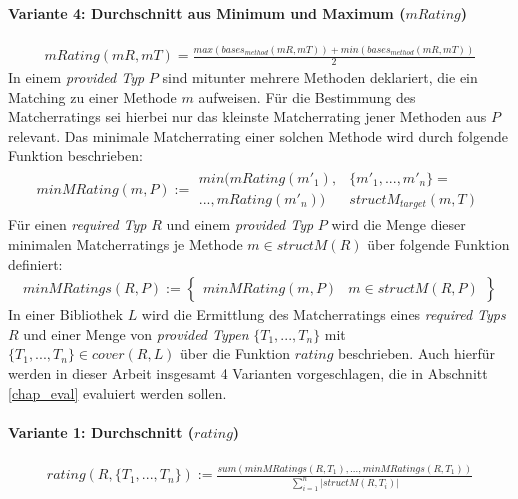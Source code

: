 \paragraph{Variante 4: Durchschnitt aus Minimum und Maximum ($\mathit{mRating}$)}

\begin{gather*}
\mathit{mRating(mR,mT)} = \frac{\mathit{max(bases_{method}(mR,mT))}+\mathit{min(bases_{method}(mR,mT))}}{2}
\end{gather*}
\noindent
In einem \emph{provided Typ} $P$ sind mitunter mehrere Methoden deklariert, die ein Matching zu einer Methode $m$ aufweisen. Für die Bestimmung des Matcherratings sei hierbei nur das kleinste Matcherrating jener Methoden aus $P$ relevant. Das minimale Matcherrating einer solchen Methode wird durch folgende Funktion beschrieben:
\begin{gather*}
\mathit{minMRating(m, P)} := 
	\begin{array}{l|l}
\mathit{min(mRating(m'_1),}
&
\{\mathit{m'_1,...,m'_n}\} =
\\
\mathit{...,mRating(m'_n))}
&
\mathit{structM_{target}(m, T)}
\end{array}
\end{gather*}
\noindent
Für einen \emph{required Typ} $R$ und einem \emph{provided Typ} $P$ wird die Menge dieser minimalen Matcherratings je Methode $m \in \mathit{structM(R)}$ über folgende Funktion definiert:
\begin{gather*}
\mathit{minMRatings(R,P)} := \left\{
\begin{array}{l|l}
	\mathit{minMRating(m,P)}
	& 
	m \in \mathit{structM(R,P)}
\end{array}
\right\}
\end{gather*}
\noindent
In einer Bibliothek $L$ wird die Ermittlung des Matcherratings eines \emph{required Typs} $R$ und einer Menge von \emph{provided Typen} $\{T_1,...,T_n\}$ mit $\{T_1,...,T_n\} \in \mathit{cover(R,L)}$ über die Funktion $\mathit{rating}$ beschrieben. Auch hierfür werden in dieser Arbeit insgesamt 4 Varianten vorgeschlagen, die in Abschnitt \ref{chap_eval} evaluiert werden sollen.
\paragraph{Variante 1: Durchschnitt ($\mathit{rating}$)}

\begin{gather*}
\mathit{rating(R,\{T_1,...,T_n\})} := \frac{\mathit{sum(minMRatings(R,T_1),...,minMRatings(R,T_1))}}{\sum_{i=1}^{n}|\mathit{structM(R,T_i)}|}
\end{gather*}

